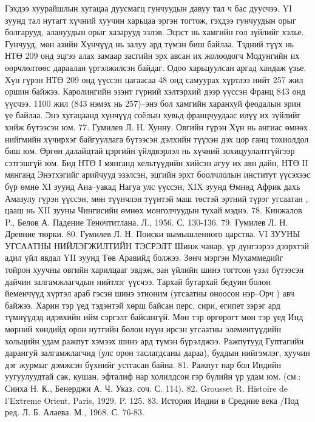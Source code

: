 Гэхдээ хуурайшлын хугацаа дуусмагц гунчуудын давуу тал ч бас дуусчээ. YI зуунд тал нутагт хүчний хуучин харьцаа эргэн тогтож, гэхдээ гунчуудын орыг болгарууд, алануудын орыг хазарууд эзлэв.
Эцэст нь хамгийн гол зүйлийг хэлье. Гунчууд, мөн азийн Хүнчүүд нь залуу ард түмэн биш байлаа. Тэдний түүх нь НТӨ 209 онд эцгээ алах замаар засгийн эрх авсан их жолоодогч Модунгийн их өөрчлөлтөөс дараалан үргэлжилсэн байдаг.
Одоо харьцуулсан аргад хандаж үзье. Хүн гүрэн НТӨ 209 онд үүссэн цагаасаа 48 онд самуурах хүртлээ нийт 257 жил оршин байжээ. Каролингийн эзэнт гүрний хэлтэрхий дээр үүссэн Франц 843 онд үүсчээ. 1100 жил (843 нэмэх нь 257)–энэ бол хамгийн харанхуй феодалын эрин үе байлаа. Энэ хугацаанд хүнчүүд соёлын хувьд францчуудаас илүү их зүйлийг хийж бүтээсэн юм. 77. Гумилев Л. Н. Хунну.
Овгийн гүрэн Хүн нь ангиас өмнөх нийгмийн хүчирхэг байгууллага бүтээсэн дэлхийн түүхэн дэх цор ганц тохиолдол биш юм. Өргөн далайцтай цэргийн үйлдвэрлэл нь хүчний зохицуулалтгүйгээр сэтгэшгүй юм. Бид НТӨ I мянганд кельтүүдийн хийсэн агуу их аян дайн, НТӨ II мянганд Энэтхэгийг арийчууд эзэлсэн, эцгийн эрхт боолчлолын институт үүсэхээс бүр өмнө XI зуунд Ана–уакад Нагуа улс үүссэн, XIX зуунд Өмнөд Африк дахь Амазулу гүрэн үүссэн, мөн түүнчлэн түүнтэй маш төстэй эртний түрэг угсаатан , цааш нь XII зууны Чингисийн өмнөх монголчуудын тухай мэднэ. 78. Кинжалов P., Белов А. Падение Теночтитлана. Л., 1956. С. 130-136. 79. Гумилев Л. Н. Древние тюрки. 80. Гумилев Л. Н. Поиски вымышленного царства.
VI ЗУУНЫ УГСААТНЫ НИЙЛЭГЖИЛТИЙН ТЭСРЭЛТ
Шинж чанар, үр дүнгээрээ дээрхтэй адил үйл явдал YII зуунд Төв Аравийд болжээ. Зөнч мэргэн Мухаммедийг тойрон хуучны овгийн харилцааг эвдэж, зан үйлийн шинэ тогтсон үзэл бүтээсэн дайчин залгамжлагчдын нийтлэг үүсчээ. Тархай бутархай бедуин болон йеменчүүд хүртэл араб гэсэн шинэ этноним (угсаатны оноосон нэр–Орч ) авч байжээ. Харин тэр үед тэдэнтэй хөрш байсан перс, сири, египет зэрэг ард түмнүүдэд идэвхийн ийм сэргэлт байсангүй.
Мөн тэр өргөрөгт мөн тэр үед Инд мөрний хөндийд орон нутгийн болон нүүн ирсэн угсаатны элементүүдийн хольцийн удам ражпут хэмээх шинэ ард түмэн бүрэлджээ. Ражпутууд Гуптагийн дарангуй залгамжлагчид (улс орон таслагдсаны дараа), буддын нийгэмлэг, хуучин дэг журмыг дэмжсэн бүхнийг устгасан байна. 81. Ражпут нар бол Индийн уугуулуудтай сак, кушан, эфталиф нар холилдсон гэр бүлийн үр удам юм. (см.: Синха Н. К., Бенерджи А. Ч. Указ. соч. С. 114). 82. Grousset R. Histoire de l’Extreme Orient. Paris, 1929. P. 125. 83. История Индии в Средние века /Под ред. Л. Б. Алаева. М., 1968. С. 76-83.
